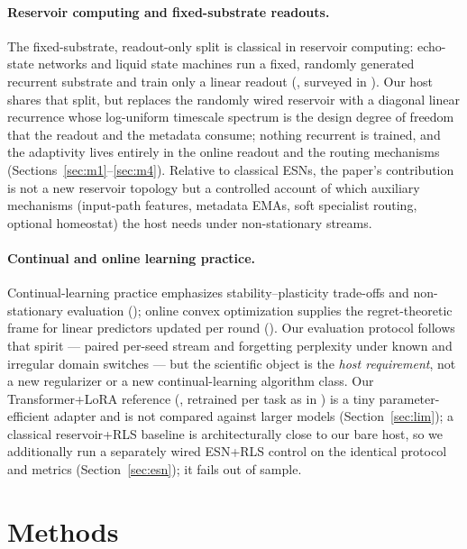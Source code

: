 \documentclass[preprint,12pt]{elsarticle}
\begin{document}
\paragraph{Reservoir computing and fixed-substrate readouts.}
The fixed-substrate, readout-only split is classical in reservoir
computing: echo-state networks and liquid state machines run a fixed,
randomly generated recurrent substrate and train only a linear readout
(\cite{jaeger2001esn,jaeger2004science,maass2002lsm,verstraeten2007},
surveyed in \cite{lukosevicius2009}). Our host shares that split, but
replaces the randomly wired reservoir with a diagonal linear
recurrence whose log-uniform timescale spectrum is the design degree
of freedom that the readout and the metadata consume; nothing
recurrent is trained, and the adaptivity lives entirely in the online
readout and the routing mechanisms
(Sections~\ref{sec:m1}--\ref{sec:m4}). Relative to classical ESNs, the
paper's contribution is not a new reservoir topology but a controlled
account of which auxiliary mechanisms (input-path features, metadata
EMAs, soft specialist routing, optional homeostat) the host needs
under non-stationary streams.

\paragraph{Continual and online learning practice.}
Continual-learning practice emphasizes stability--plasticity trade-offs
and non-stationary evaluation (\cite{parisi2019}); online convex
optimization supplies the regret-theoretic frame for linear predictors
updated per round (\cite{zinkevich2003,cesabianchi2006}). Our
evaluation protocol follows that spirit --- paired per-seed stream and
forgetting perplexity under known and irregular domain switches ---
but the scientific object is the \emph{host requirement}, not a new
regularizer or a new continual-learning algorithm class. Our
Transformer+LoRA reference (\cite{hu2022lora}, retrained per task as
in \cite{redemc}) is a tiny parameter-efficient adapter and is not
compared against larger models (Section~\ref{sec:lim}); a classical
reservoir+RLS baseline is architecturally close to our bare host, so
we additionally run a separately wired ESN+RLS control on the identical
protocol and metrics (Section~\ref{sec:esn}); it fails out of sample.

\section{Methods}
\label{sec:methods}
\end{document}

